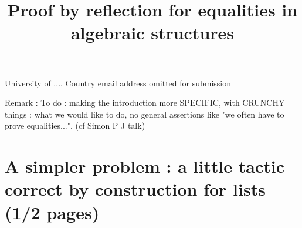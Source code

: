 \documentclass{sigplanconf}
\begin{document}
\setlength{\pdfpageheight}{\paperheight}
\setlength{\pdfpagewidth}{\paperwidth}






\title{Proof by reflection for equalities in algebraic structures}

           {University of ..., Country}
           {email address omitted for submission}



\maketitle

\nocite{*}







Remark : To do : making the introduction more SPECIFIC, with CRUNCHY things : what we would like to do, no general assertions like "we often have to prove equalities...". (cf Simon P J talk)



         
\section {A simpler problem : a little tactic correct by construction for lists (1/2 pages)}
\end{document}
